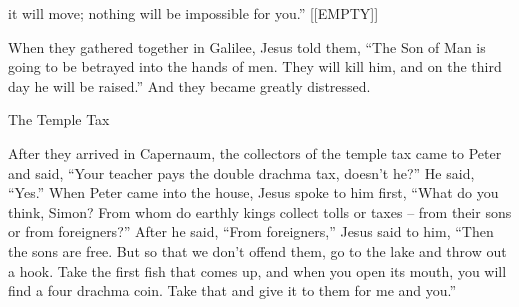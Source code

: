{it will move;
nothing
will be impossible
for you.”
[[EMPTY]]
\par }{\SH \par }{\PP {}When
they gathered together
in
Galilee,
Jesus
told
them,
“The Son
of Man
is going
to be betrayed
into
the hands
of men.
They will kill
him,
and
on the third
day
he will be raised.”
And
they became
greatly
distressed.
\par }{\SH The Temple Tax
\par }{\PP {}After
they
arrived
in
Capernaum,
the collectors
of the temple tax
came
to Peter
and
said,
“Your
teacher
pays
the double drachma tax,
doesn’t he?”
He said,
“Yes.”
When
Peter came
into
the house,
Jesus
spoke
to him
first, “What
do
you
think,
Simon? From
whom do
earthly
kings
collect
tolls
or
taxes
– from
their
sons
or
from
foreigners?”
After
he said,
“From
foreigners,”
Jesus
said
to him,
“Then
the sons
are
free.
But
so that
we
don’t
offend
them,
go
to
the lake
and throw out
a hook.
Take
the first
fish
that comes up,
and
when
you open
its
mouth,
you will find
a four drachma coin.
Take
that
and give
it to them
for
me
and
you.”

}
